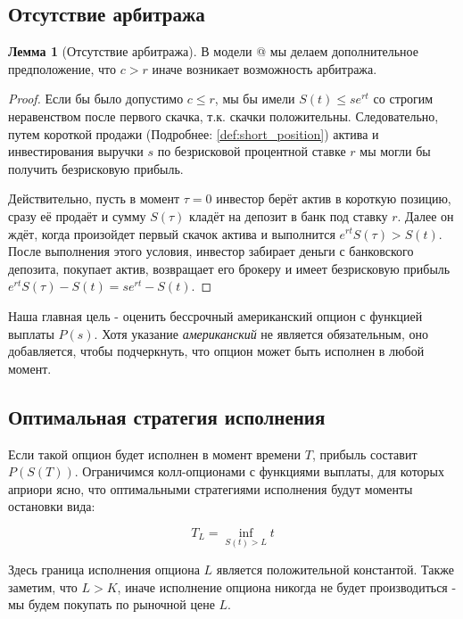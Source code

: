 \documentclass[a4paper,12pt]{article}
\makeatletter
\theoremstyle{definition}
\newtheorem{lemma}{Лемма}
\newcommand*{\rom}[1]{\expandafter\@slowromancap\romannumeral #1@}
\makeatother
\begin{document}
\subsection{Отсутствие арбитража}

\begin{lemma}[Отсутствие арбитража]\label{thm:no_arbitrage_theoreme}
В модели \rom{2} мы делаем дополнительное предположение, что $c > r$ иначе возникает возможность арбитража. 
\end{lemma}
\begin{proof}
Если бы было допустимо $c \le r$, мы бы имели $S(t) \le s e^{rt}$ со строгим неравенством после первого скачка, т.к. скачки положительны. Следовательно, путем короткой продажи (Подробнее: \ref{def:short_position}) актива и инвестирования выручки $s$ по безрисковой процентной ставке $r$ мы могли бы получить безрисковую прибыль.

Действительно, пусть в момент $\tau = 0$ инвестор берёт актив в короткую позицию, сразу её продаёт и сумму $S(\tau)$ кладёт на депозит в банк под ставку $r$. Далее он ждёт, когда произойдет первый скачок актива и выполнится $e^{rt} S(\tau) > S(t)$. После выполнения этого условия, инвестор забирает деньги с банковского депозита, покупает актив, возвращает его брокеру и имеет безрисковую прибыль $e^{rt}S(\tau) - S(t) = s e^{rt} - S(t)$.
\end{proof}

Наша главная цель - оценить бессрочный американский
опцион с функцией выплаты $P(s)$. Хотя указание \textit{американский} не является обязательным, оно добавляется, чтобы подчеркнуть, что опцион может быть исполнен в любой момент.

\subsection{Оптимальная стратегия исполнения}

Если такой опцион будет исполнен в момент времени $T$, прибыль составит $P(S(T))$. Ограничимся колл-опционами с функциями выплаты, для которых априори ясно, что оптимальными стратегиями исполнения будут моменты остановки вида:

\begin{equation}\label{eq:optimal_excersize}
T_L = \inf\limits_{S(t) > L}{t}
\end{equation}

Здесь граница исполнения опциона $L$ является положительной константой. Также заметим, что $L > K$, иначе исполнение опциона никогда не будет производиться - мы будем покупать по рыночной цене $L$. 
\end{document}
